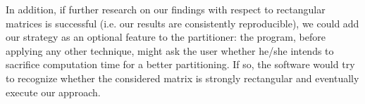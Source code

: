 In addition, if further research on our findings with respect to rectangular matrices is successful (i.e. our results are consistently reproducible), we could add our strategy as an optional feature to the partitioner: the program, before applying any other technique, might ask the user whether he/she intends to sacrifice computation time for a better partitioning. If so, the software would try to recognize whether the considered matrix is strongly rectangular and eventually execute our approach.
